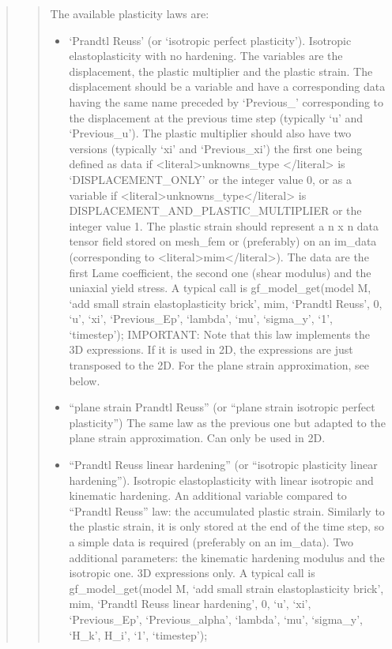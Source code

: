 \documentclass[a4paper,11pt,english]{sphinxmanual}
\begin{document}
\begin{quote}
\begin{quote}
\sphinxAtStartPar
The available plasticity laws are:
\begin{itemize}
\item {} 
\sphinxAtStartPar
‘Prandtl Reuss’ (or ‘isotropic perfect plasticity’).
Isotropic elasto\sphinxhyphen{}plasticity with no hardening. The variables are the
displacement, the plastic multiplier and the plastic strain.
The displacement should be a variable and have a corresponding data
having the same name preceded by ‘Previous\_’ corresponding to the
displacement at the previous time step (typically ‘u’ and ‘Previous\_u’).
The plastic multiplier should also have two versions (typically ‘xi’
and ‘Previous\_xi’) the first one being defined as data if
\textless{}literal\textgreater{}unknowns\_type \textless{}/literal\textgreater{} is ‘DISPLACEMENT\_ONLY’ or the integer value 0, or as
a variable if \textless{}literal\textgreater{}unknowns\_type\textless{}/literal\textgreater{} is DISPLACEMENT\_AND\_PLASTIC\_MULTIPLIER
or the integer value 1.
The plastic strain should represent a n x n data tensor field stored
on mesh\_fem or (preferably) on an im\_data (corresponding to \textless{}literal\textgreater{}mim\textless{}/literal\textgreater{}).
The data are the first Lame coefficient, the second one (shear modulus)
and the uniaxial yield stress. A typical call is
gf\_model\_get(model M, ‘add small strain elastoplasticity brick’, mim, ‘Prandtl Reuss’, 0, ‘u’, ‘xi’, ‘Previous\_Ep’, ‘lambda’, ‘mu’, ‘sigma\_y’, ‘1’, ‘timestep’);
IMPORTANT: Note that this law implements
the 3D expressions. If it is used in 2D, the expressions are just
transposed to the 2D. For the plane strain approximation, see below.

\item {} 
\sphinxAtStartPar
“plane strain Prandtl Reuss”
(or “plane strain isotropic perfect plasticity”)
The same law as the previous one but adapted to the plane strain
approximation. Can only be used in 2D.

\item {} 
\sphinxAtStartPar
“Prandtl Reuss linear hardening”
(or “isotropic plasticity linear hardening”).
Isotropic elasto\sphinxhyphen{}plasticity with linear isotropic and kinematic
hardening. An additional variable compared to “Prandtl Reuss” law:
the accumulated plastic strain. Similarly to the plastic strain, it
is only stored at the end of the time step, so a simple data is
required (preferably on an im\_data).
Two additional parameters: the kinematic hardening modulus and the
isotropic one. 3D expressions only. A typical call is
gf\_model\_get(model M, ‘add small strain elastoplasticity brick’, mim, ‘Prandtl Reuss linear hardening’, 0, ‘u’, ‘xi’, ‘Previous\_Ep’, ‘Previous\_alpha’, ‘lambda’, ‘mu’, ‘sigma\_y’, ‘H\_k’, H\_i’, ‘1’, ‘timestep’);


\end{itemize}
\end{quote}
\end{quote}
\end{document}
